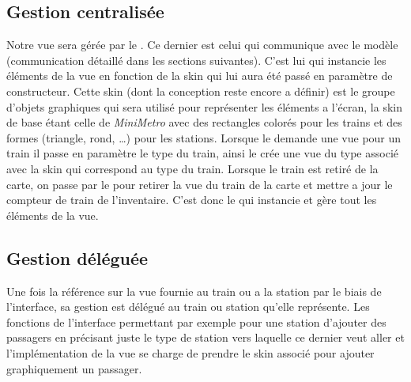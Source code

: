 \documentclass[report, backcover, french, nodocumentinfo]{upmethodology-document}
\begin{document}
			\subsection{Gestion centralisée}
				Notre vue sera gérée par le . Ce dernier est celui qui communique avec le modèle (communication détaillé dans les sections suivantes). C'est lui qui instancie les éléments de la vue en fonction de la skin qui lui aura été passé en paramètre de constructeur. Cette skin (dont la conception reste encore a définir) est le groupe d'objets graphiques qui sera utilisé pour représenter les éléments a l'écran, la skin de base étant celle de \textit{MiniMetro} avec des rectangles colorés pour les trains et des formes (triangle, rond, \ldots) pour les stations. Lorsque le  demande une vue pour un train il passe en paramètre le type du train, ainsi le  crée une vue du type associé avec la skin qui correspond au type du train. Lorsque le train est retiré de la carte, on passe par le  pour retirer la vue du train de la carte et mettre a jour le compteur de train de l'inventaire. C'est donc le  qui instancie et gère tout les éléments de la vue.
			\subsection{Gestion déléguée}
				Une fois la référence sur la vue fournie au train ou a la station par le biais de l'interface, sa gestion est délégué au train ou station qu'elle représente. Les fonctions de l'interface permettant par exemple pour une station d'ajouter des passagers en précisant juste le type de station vers laquelle ce dernier veut aller et l'implémentation de la vue se charge de prendre le skin associé pour ajouter graphiquement un passager.
\end{document}
